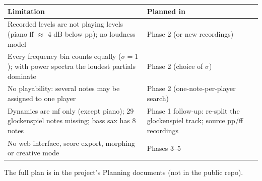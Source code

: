 \documentclass[
  10pt,
]{article}
\begin{document}
\begin{longtable}[]{@{}ll@{}}
\toprule
\begin{minipage}[b]{0.47\columnwidth}\raggedright
Limitation\strut
\end{minipage} &
\begin{minipage}[b]{0.47\columnwidth}\raggedright
Planned in\strut
\end{minipage}\tabularnewline
\midrule
\endhead
\begin{minipage}[t]{0.47\columnwidth}\raggedright
Recorded levels are not playing levels (piano ff $\approx$ 4 dB
below pp); no loudness model\strut
\end{minipage} &
\begin{minipage}[t]{0.47\columnwidth}\raggedright
Phase 2 (or new recordings)\strut
\end{minipage}\tabularnewline
\begin{minipage}[t]{0.47\columnwidth}\raggedright
Every frequency bin counts equally ($\sigma = 1$); with power
spectra the loudest partials dominate\strut
\end{minipage} &
\begin{minipage}[t]{0.47\columnwidth}\raggedright
Phase 2 (choice of $\sigma$)\strut
\end{minipage}\tabularnewline
\begin{minipage}[t]{0.47\columnwidth}\raggedright
No playability: several notes may be assigned to one
player\strut
\end{minipage} &
\begin{minipage}[t]{0.47\columnwidth}\raggedright
Phase 2 (one-note-per-player search)\strut
\end{minipage}\tabularnewline
\begin{minipage}[t]{0.47\columnwidth}\raggedright
Dynamics are mf only (except piano); 29 glockenspiel notes
missing; bass sax has 8 notes\strut
\end{minipage} &
\begin{minipage}[t]{0.47\columnwidth}\raggedright
Phase 1 follow-up: re-split the glockenspiel track; source
pp/ff recordings\strut
\end{minipage}\tabularnewline
\begin{minipage}[t]{0.47\columnwidth}\raggedright
No web interface, score export, morphing or creative
mode\strut
\end{minipage} &
\begin{minipage}[t]{0.47\columnwidth}\raggedright
Phases 3--5\strut
\end{minipage}\tabularnewline
\bottomrule
\end{longtable}

The full plan is in the project's Planning documents (not in
the public repo).
\end{document}
